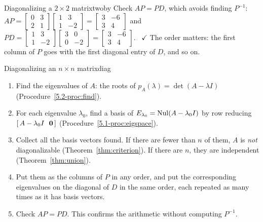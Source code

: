 \documentclass[11pt]{article}
\begin{document}
\begin{exmp}{Diagonalizing a $2\times2$ matrix}{twoby}
Check $AP=PD$, which avoids finding $P^{-1}$: $AP=\begin{bmatrix}0&3\\2&1\end{bmatrix}\begin{bmatrix}1&3\\1&-2\end{bmatrix}=\begin{bmatrix}3&-6\\3&4\end{bmatrix}$ and $PD=\begin{bmatrix}1&3\\1&-2\end{bmatrix}\begin{bmatrix}3&0\\0&-2\end{bmatrix}=\begin{bmatrix}3&-6\\3&4\end{bmatrix}$. \ $\checkmark$ The order matters: the first column of $P$ goes with the first diagonal entry of $D$, and so on.
\end{exmp}

\begin{proc}{Diagonalizing an $n\times n$ matrix}{diag}
\begin{enumerate}[itemsep=1pt]
  \item Find the eigenvalues of $A$: the roots of $p_A(\lambda)=\det(A-\lambda I)$ (Procedure~\ref{5.2-proc:find}).
  \item For each eigenvalue $\lambda_0$, find a basis of $E_{\lambda_0}=\operatorname{Nul}(A-\lambda_0I)$ by row reducing $[\,A-\lambda_0I\ \ \mathbf{0}\,]$ (Procedure~\ref{5.1-proc:eigspace}).
  \item Collect all the basis vectors found. If there are fewer than $n$ of them, $A$ is \emph{not} diagonalizable (Theorem~\ref{thm:criterion}). If there are $n$, they are independent (Theorem~\ref{thm:union}).
  \item Put them as the columns of $P$ in any order, and put the corresponding eigenvalues on the diagonal of $D$ in the same order, each repeated as many times as it has basis vectors.
  \item Check $AP=PD$. This confirms the arithmetic without computing $P^{-1}$.
\end{enumerate}
\end{proc}
\end{document}
